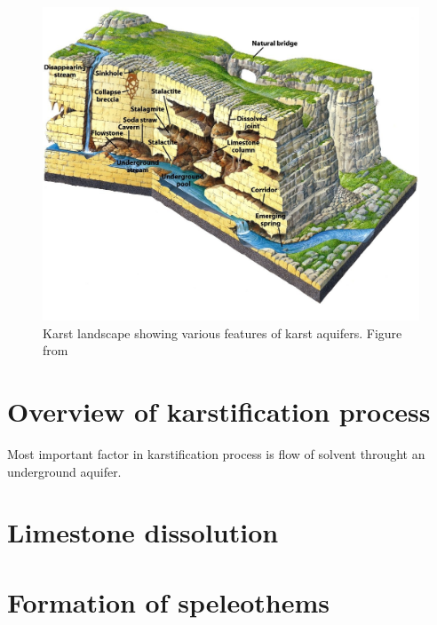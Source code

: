 \begin{figure}
  \centerline{\includegraphics[width=480px]{chapters/karstification/karst_landscape.jpg}}
  \caption{Karst landscape showing various features of karst aquifers.
    Figure from \cite{marshak2006}}
\end{figure}

\section{Overview of karstification process}

Most important factor in karstification process is flow of solvent throught an
underground aquifer. 

\section{Limestone dissolution}

\section{Formation of speleothems}
